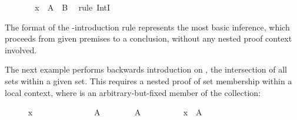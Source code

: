 \begin{isabellebody}
\ \ \ \ \isamarkupfalse%
\ \isamarkupfalse%
\ {\isachardoublequoteopen}x\ {\isasymin}\ A\ {\isasyminter}\ B{\isachardoublequoteclose}\ \isamarkupfalse%
\ {\isacharparenleft}rule\ IntI{\isacharparenright}%
\endisatagproof
{\isafoldproof}%
%
\isadelimproof
%
\endisadelimproof
%
\begin{isamarkuptext}%
\noindent The format of the \isa{{\isachardoublequote}{\isasyminter}{\isachardoublequote}}-introduction rule represents
  the most basic inference, which proceeds from given premises to a
  conclusion, without any nested proof context involved.

  The next example performs backwards introduction on \isa{{\isachardoublequote}{\isasymInter}{\isasymA}{\isachardoublequote}},
  the intersection of all sets within a given set.  This requires a
  nested proof of set membership within a local context, where  is an arbitrary-but-fixed member of the collection:%
\end{isamarkuptext}%
\isamarkuptrue%
%
\medskip\begin{minipage}{0.6\textwidth}
%
\isadelimproof
\ \ \ \ %
\endisadelimproof
%
\isatagproof
{}\isamarkupfalse%
\ {\isachardoublequoteopen}x\ {\isasymin}\ {\isasymInter}{\isasymA}{\isachardoublequoteclose}\isanewline
\ \ \ \ \isamarkupfalse%
\isanewline
\ \ \ \ \ \ \isamarkupfalse%
\ A\isanewline
\ \ \ \ \ \ \isamarkupfalse%
\ {\isachardoublequoteopen}A\ {\isasymin}\ {\isasymA}{\isachardoublequoteclose}\isanewline
\ \ \ \ \ \ \isamarkupfalse%
\ {\isachardoublequoteopen}x\ {\isasymin}\ A{\isachardoublequoteclose}%
\endisatagproof
{\isafoldproof}%
%
\isadelimproof
%
\endisadelimproof
%
\isadelimnoproof
\ %
\endisadelimnoproof
%
\isatagnoproof
{}\isamarkupfalse%
%
\endisatagnoproof
{\isafoldnoproof}%
%
\isadelimnoproof
%
\endisadelimnoproof
\isanewline
%
\isadelimproof
\ \ \ \ %
\endisadelimproof
%
\isatagproof
{}\isamarkupfalse%
%
\endisatagproof
{\isafoldproof}%
%
\isadelimproof
%
\endisadelimproof
%
\end{minipage}\begin{minipage}{0.4\textwidth}
%
\begin{isamarkuptext}%
%

\end{isamarkuptext}
\end{minipage}
\end{isabellebody}
